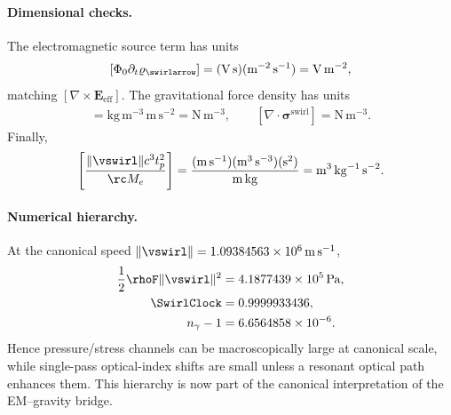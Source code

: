         \paragraph{Dimensional checks.}
        The electromagnetic source term has units
        \begin{align}
            \left[\Phi_0\partial_t\varrho_{\swirlarrow}\right]
            =
            (\mathrm{V\,s})(\mathrm{m^{-2}\,s^{-1}})
            =
            \mathrm{V\,m^{-2}},
        \end{align}
        matching \([\nabla\times\mathbf{E}_{\mathrm{eff}}]\). The gravitational force density has units
        \begin{align}
            [\rhoM\mathbf{g}_{\swirlarrow}]
            =
            \mathrm{kg\,m^{-3}}\,\mathrm{m\,s^{-2}}
            =
            \mathrm{N\,m^{-3}},
            \qquad
            [\nabla\cdot\boldsymbol{\sigma}^{\mathrm{swirl}}]
            =
            \mathrm{N\,m^{-3}}.
        \end{align}
        Finally,
        \begin{align}
            \left[
            \frac{\lVert\vswirl\rVert c^3 t_p^2}{\rc M_e}
            \right]
            =
            \frac{(\mathrm{m\,s^{-1}})(\mathrm{m^3\,s^{-3}})(\mathrm{s^2})}
            {\mathrm{m}\,\mathrm{kg}}
            =
            \mathrm{m^3\,kg^{-1}\,s^{-2}}.
        \end{align}

        \paragraph{Numerical hierarchy.}
        At the canonical speed \(\lVert\vswirl\rVert=1.09384563\times10^6\,\mathrm{m\,s^{-1}}\),
        \begin{align}
            \frac{1}{2}\rhoF\lVert\vswirl\rVert^2
            &=
            4.1877439\times10^5\,\mathrm{Pa},
            \\
            \SwirlClock
            &=
            0.9999933436,
            \\
            n_\gamma-1
            &=
            6.6564858\times10^{-6}.
            \label{eq:canonical_emg_numerical_hierarchy}
        \end{align}
        Hence pressure/stress channels can be macroscopically large at canonical scale, while single-pass optical-index shifts are small unless a resonant optical path enhances them. This hierarchy is now part of the canonical interpretation of the EM--gravity bridge.

